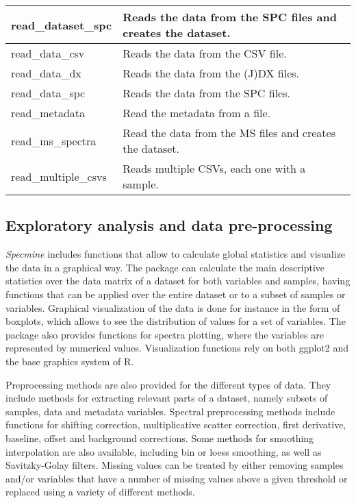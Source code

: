 \begin{scriptsize}
\begin{longtable}{|m{4.3cm}|m{10cm}|}
		\hline
		read\_dataset\_spc & Reads the data from the SPC files and creates the dataset. \\
		
		\hline
		read\_data\_csv & Reads the data from the CSV file. \\
		
		\hline
		read\_data\_dx & Reads the data from the (J)DX files. \\
		
		\hline
		read\_data\_spc & Reads the data from the SPC files. \\
		
		\hline
		read\_metadata & Read the metadata from a file. \\
		
		\hline
		read\_ms\_spectra & Read the data from the MS files and creates the dataset. \\
		
		\hline
		read\_multiple\_csvs & Reads multiple CSVs, each one with a sample. \\
		
		\hline
		
	\end{longtable}
\end{scriptsize}

\subsection{Exploratory analysis and data pre-processing}

\textit{Specmine} includes functions that allow to calculate global statistics and visualize the data in a graphical way. The package can calculate the main descriptive statistics over the data matrix of a dataset for both variables and samples, having functions that can be applied over the entire dataset or to a subset of samples or variables. Graphical visualization of the data is done for instance in the form of boxplots, which allows to see the distribution of values for a set of variables. The package also provides functions for spectra plotting, where the variables are represented by numerical values. Visualization functions rely on both ggplot2 and the base graphics system of R.

Preprocessing methods are also provided for the different types of data. They include methods for extracting relevant parts of a dataset, namely subsets of samples, data and metadata variables. Spectral preprocessing methods include functions for shifting correction, multiplicative scatter correction, first derivative, baseline, offset and background corrections. Some methods for smoothing interpolation are also available, including bin or loess smoothing, as well as Savitzky-Golay filters. Missing values can be treated by either removing samples and/or variables that have a number of missing values above a given threshold or replaced using a variety of different methods. 


